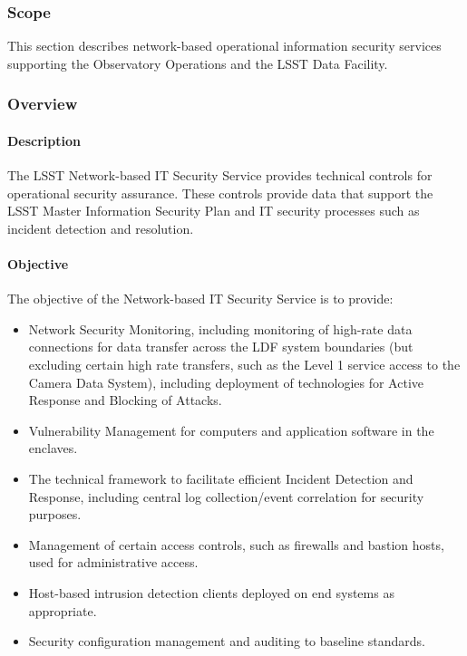 ﻿\subsubsection{Scope}

This section describes network-based operational information security services 
supporting the Observatory Operations and the LSST Data Facility.

\subsubsection{Overview}

\paragraph{Description}

The LSST Network-based IT Security Service provides technical controls for 
operational security assurance. These controls provide data that support the 
LSST Master Information Security Plan and IT security processes such as incident 
detection and resolution.

\paragraph{Objective}

The objective of the Network-based IT Security Service is to provide:

\begin{itemize}
\item Network Security Monitoring, including monitoring of high-rate data 
connections for data transfer across the LDF system boundaries (but excluding 
certain high rate transfers, such as the Level 1 service access to the Camera 
Data System), including deployment of technologies for Active Response and 
Blocking of Attacks.
\item Vulnerability Management for computers and application software in the 
enclaves.
\item The technical framework to facilitate efficient Incident Detection and 
Response, including central log collection/event correlation for security purposes.
\item Management of certain access controls, such as firewalls and bastion hosts, 
used for administrative access.
\item Host-based intrusion detection clients deployed on end systems as 
appropriate.
\item Security configuration management and auditing to baseline standards.
\end{itemize}

